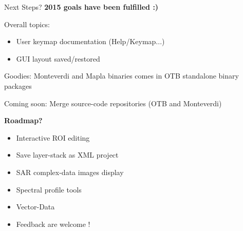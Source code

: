 \documentclass[smaller]{beamer}
\begin{document}
\begin{frame}{Next Steps?}
\textbf{2015 goals have been fulfilled :)}


Overall topics:
\begin{itemize}   
  \item User keymap documentation (Help/Keymap...)
  \item GUI layout saved/restored
\end{itemize} 


Goodies: Monteverdi and Mapla binaries comes in OTB standalone binary packages 

Coming soon: Merge source-code repositories (OTB and Monteverdi)

\textbf{Roadmap?}
\begin{itemize}
   \item Interactive ROI editing
   \item Save layer-stack as XML project
   \item SAR complex-data images display
   \item Spectral profile tools
   \item Vector-Data
   \item Feedback are welcome !
\end{itemize}

\end{frame} 
\end{document}
